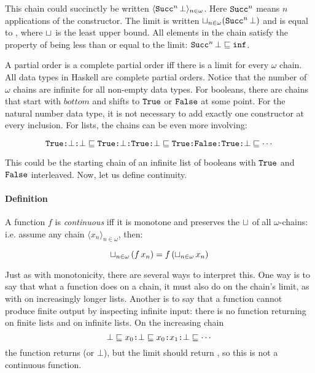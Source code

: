 This chain could succinctly be written $\langle \texttt{Succ}^n \, \bot
\rangle_{n \in \omega}$.  Here $\texttt{Succ}^n$ means $n$ applications of
the  constructor. The limit is written $\sqcup_{n \in
  \omega}(\texttt{Succ}^n \, \bot)$ and is equal to , where
$\sqcup_{}$ is the least upper bound. All elements in the chain satisfy
the property of being less than or equal to the limit: $\texttt{Succ}^n \,
\bot \sqsubseteq \texttt{inf}$.

A partial order is a complete partial order iff there is a limit for
every $\omega$ chain. All data types in Haskell are complete partial
orders. Notice that the number of $\omega$ chains are infinite for all
non-empty data types. For booleans, there are chains that start with
$bottom$ and shifts to $\texttt{True}$ or $\texttt{False}$ at some point. For
the natural number data type, it is not necessary to add exactly one
 constructor at every inclusion. For lists, the chains can be
even more involving:

\newcommand\trueV{\hs{True}}
\newcommand\consV{\hs{:}}
\newcommand\falseV{\hs{False}}

\begin{equation*}
  \trueV \consV \bot    \consV \bot                    \sqsubseteq
  \trueV \consV \bot    \consV \trueV \consV \bot      \sqsubseteq
  \trueV \consV \falseV \consV \trueV \consV \bot      \sqsubseteq
  \cdots
\end{equation*}

This could be the starting chain of an infinite list of booleans with $\trueV$
and $\falseV$ interleaved. Now, let us define continuity.

\begin{comment}
\footnonte{Notice that the data type \hs{data StrictNat = Zero |
    Succ !StrictNat} is flat and therefore complete.}.
\end{comment}

\paragraph{Definition} A function $f$ is \emph{continuous} iff it is
monotone and preserves the $\sqcup_{ }$ of all $\omega$-chains: i.e.
assume any chain $\langle x_n \rangle_{n \in \omega}$, then:

\begin{equation*}
\sqcup_{n \in \omega} \, (f \, x_n) = f \, (\sqcup_{n \in \omega} \, x_n)
\end{equation*}

Just as with monotonicity, there are several ways to interpret
this. One way is to say that what a function does on a chain, it must
also do on the chain's limit, as with  on increasingly longer
lists. Another is to say that a function cannot produce finite output by
inspecting infinite input: there is no function
 returning  on finite lists and
 on infinite lists. On the increasing chain
$$ \bot \sqsubseteq x_0 \texttt{:} \bot \sqsubseteq x_0 \texttt{:} x_1 \texttt{:} \bot
\sqsubseteq \cdots$$
the function  returns  (or $\bot$), but the
limit should return , so this is not a continuous function.

